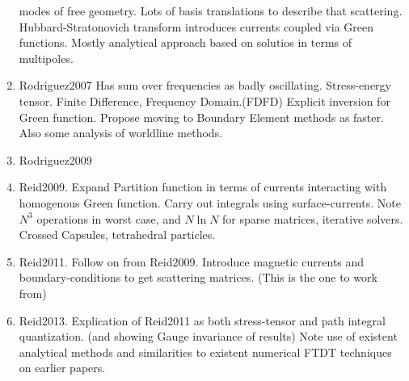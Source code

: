 \begin{enumerate}
modes of free geometry.  Lots of basis translations to describe that scattering.  Hubbard-Stratonovich transform
introduces currents coupled via Green functions.  Mostly analytical approach based on solutios in terms of multipoles.
\item Rodriguez2007
Has sum over frequencies as badly oscillating.  Stress-energy tensor.  Finite Difference, Frequency Domain.(FDFD)
Explicit inversion for Green function.  Propose moving to Boundary Element methods as faster.
Also some analysis of worldline methods.
\item Rodriguez2009
\item Reid2009.  Expand Partition function in terms of currents interacting with homogenous Green function.
Carry out integrals using surface-currents.  
Note $N^3$ operations in worst case, and $N\ln N$ for sparse matrices, iterative solvers.  
Crossed Capsules, tetrahedral particles.  \cite{Reid2009}
\item Reid2011.  Follow on from Reid2009.  Introduce magnetic currents and boundary-conditions to get scattering matrices.
(This is the one to work from)\cite{Reid2011}
\item Reid2013.  Explication of Reid2011 as both stress-tensor and path integral quantization.  (and showing
Gauge invariance of results)\cite{Reid2013}
\cite{Emig2004, Emig2007, Rahi2009}
\cite{Kenneth2006}
  Note use of existent analytical methods and similarities to existent 
  numerical FTDT techniques on earlier papers.  
  \cite{Rodriguez2007,Rodriguez2007a, Rodriguez2009}
\end{enumerate}

